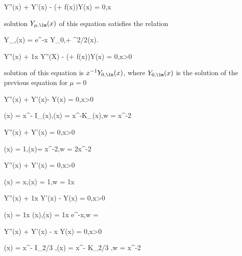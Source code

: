\item 

\be
{} Y''(x) + \mu Y'(x) - (\lm + f(x))Y(x) = 0,\quad x\in \R
\ee

solution $Y_{\mu,\lm}(x)$ of this equation satisfies the relation

\be
Y_{\mu,\lm}(x) = e^{-\mu x} Y_{0,\lm + \mu^2/2}(x).
\ee

\item 

\be
{} Y''(x) + \frac 1x Y''(X) - (\lm + f(x))Y(x) = 0,\quad x>0
\ee

solution of this equation is $x^{-1}Y_{0,\lm}(x)$, where $Y_{0,\lm}(x)$ is the solution of the previous equation for $\mu = 0$


\item 
\be
{} Y''(x) + Y'(x)- \lm Y(x) = 0,\quad x>0
\ee

\be
\psi(x) = x^{-\nu} I_\nu (x\sqrt{2\lm}),\quad\quad \varphi(x) = x^{-\nu}K_\nu(x\sqrt{2\lm}),\quad\quad w = x^{-2}
\ee

\item 

\be
{} Y''(x) +  Y'(x) = 0,\quad x>0
\ee

\be
\psi(x) = 1,\quad\quad \varphi(x)= x^{-2\nu},\quad\quad w = 2\nu x^{-2}
\ee

\item 

\be
{} Y''(x) +  Y'(x) = 0,\quad x>0
\ee

\be
\psi(x) = \ln x,\quad\quad \varphi(x) = 1,\quad\quad w = \frac 1x
\ee

\item 

\be
{} Y''(x) + \frac 1x Y'(x) - \lm Y(x) = 0,\quad x>0
\ee

\be
\psi(x) = \frac 1x \sinh (x\sqrt{2\lm}),\quad\quad \varphi(x) = \frac 1x e^{-x\sqrt{2\lm}},\quad\quad w = 
\ee

\item 

\be
{} Y''(x) + Y'(x) - \gamma x Y(x) = 0,\quad x>0
\ee

\be
\psi(x) = x^{-\nu} I_{2\nu/3} ,\quad\quad \varphi(x) = x^{-\nu} K_{2\nu/3} ,\quad\quad w =  x^{-2}
\ee


\item 

